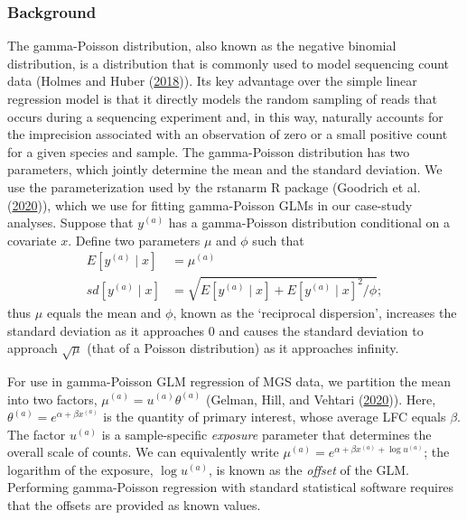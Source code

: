 \documentclass[
]{article}
\begin{document}
\hypertarget{background}{%
\subsubsection{Background}\label{background}}

The gamma-Poisson distribution, also known as the negative binomial distribution, is a distribution that is commonly used to model sequencing count data (Holmes and Huber (\protect\hyperlink{ref-holmes2018mode}{2018})).
Its key advantage over the simple linear regression model is that it directly models the random sampling of reads that occurs during a sequencing experiment and, in this way, naturally accounts for the imprecision associated with an observation of zero or a small positive count for a given species and sample.
The gamma-Poisson distribution has two parameters, which jointly determine the mean and the standard deviation.
We use the parameterization used by the rstanarm R package (Goodrich et al. (\protect\hyperlink{ref-rstanarm}{2020})), which we use for fitting gamma-Poisson GLMs in our case-study analyses.
Suppose that \(y^{(a)}\) has a gamma-Poisson distribution conditional on a covariate \(x\).
Define two parameters \(\mu\) and \(\phi\) such that
\begin{align}
  E[y^{(a)} \mid x]  &= \mu^{(a)} \\
  sd[y^{(a)} \mid x] &= \sqrt{
    E[y^{(a)} \mid x] + E[y^{(a)} \mid x]^2 / \phi
  };
\end{align}
thus \(\mu\) equals the mean and \(\phi\), known as the `reciprocal dispersion', increases the standard deviation as it approaches 0 and causes the standard deviation to approach \(\sqrt{\mu}\) (that of a Poisson distribution) as it approaches infinity.

For use in gamma-Poisson GLM regression of MGS data, we partition the mean into two factors, \(\mu^{(a)} = u^{(a)} \theta^{(a)}\) (Gelman, Hill, and Vehtari (\protect\hyperlink{ref-gelman2020regr}{2020})).
Here, \(\theta^{(a)} = e^{\alpha + \beta x^{(a)}}\) is the quantity of primary interest, whose average LFC equals \(\beta\).
The factor \(u^{(a)}\) is a sample-specific \emph{exposure} parameter that determines the overall scale of counts.
We can equivalently write \(\mu^{(a)} = e^{\alpha + \beta x^{(a)} + \log u^{(a)}}\);
the logarithm of the exposure, \(\log u^{(a)}\), is known as the \emph{offset} of the GLM.
Performing gamma-Poisson regression with standard statistical software requires that the offsets are provided as known values.
\end{document}
